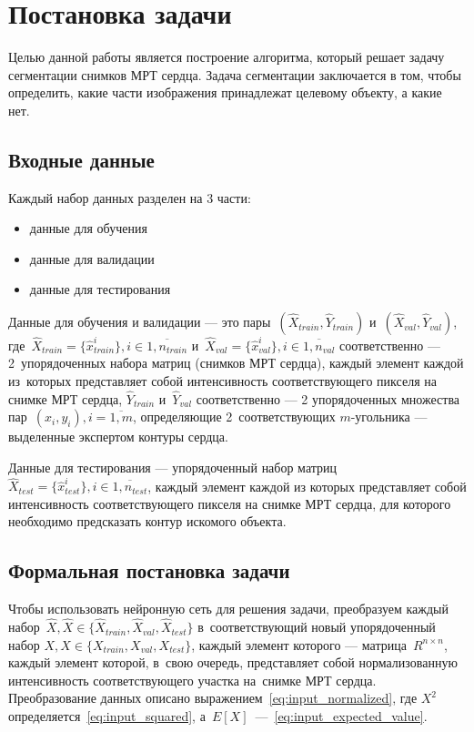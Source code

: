 \section{Постановка задачи}

Целью данной работы является построение алгоритма, который решает задачу сегментации снимков МРТ сердца. Задача сегментации заключается в том, чтобы определить, какие части изображения принадлежат целевому объекту, а какие нет. 

\subsection{Входные данные}

Каждый набор данных разделен на 3 части: 

\begin{itemize}
  \item данные для обучения
  \item данные для валидации
  \item данные для тестирования
\end{itemize}

Данные для обучения и валидации — это пары~$(\hat{X}_{train},\hat{Y}_{train})$ 
и~$(\hat{X}_{val},\hat{Y}_{val})$, 
где~$\hat{X}_{train} = \{\hat{x}_{train}^{i}\}, i\in{}\overline{1,n_{train}}$ 
и~$\hat{X}_{val} = \{\hat{x}_{val}^{i}\}, i\in{}\overline{1,n_{val}}$ соответственно 
— 2~упорядоченных набора матриц (снимков МРТ сердца), каждый элемент каждой из~которых 
представляет собой интенсивность соответствующего пикселя на снимке МРТ сердца, 
$\hat{Y}_{train}$ и~$\hat{Y}_{val}$ соответственно 
— 2 упорядоченных множества пар~$(x_{i},y_{i}), i = \overline{1,m}$, 
определяющие 2~соответствующих \mbox{$m$-угольника} 
— выделенные экспертом контуры сердца.

Данные для тестирования — упорядоченный набор матриц $\hat{X}_{test} = \{\hat{x}_{test}^{i}\}, i\in{}\overline{1,n_{test}}$, каждый элемент каждой из которых представляет собой интенсивность соответствующего пикселя на снимке МРТ сердца, для которого необходимо предсказать контур искомого объекта.

\subsection{Формальная постановка задачи}

Чтобы использовать нейронную сеть для решения задачи, преобразуем каждый 
набор~$\hat{X},\hat{X}\in{}\{\hat{X}_{train},\hat{X}_{val},\hat{X}_{test}\}$ 
в~соответствующий новый упорядоченный набор $X,X\in{}\{X_{train},X_{val},X_{test}\}$, 
каждый элемент которого — матрица~$R^{n\times{}n}$, каждый элемент которой, 
в~свою очередь, представляет собой нормализованную интенсивность соответствующего 
участка на~снимке МРТ сердца. Преобразование данных описано выражением~\eqref{eq:input_normalized},
где $X^{2}$ определяется~\eqref{eq:input_squared}, а~$E[X]$~—~\eqref{eq:input_expected_value}.

